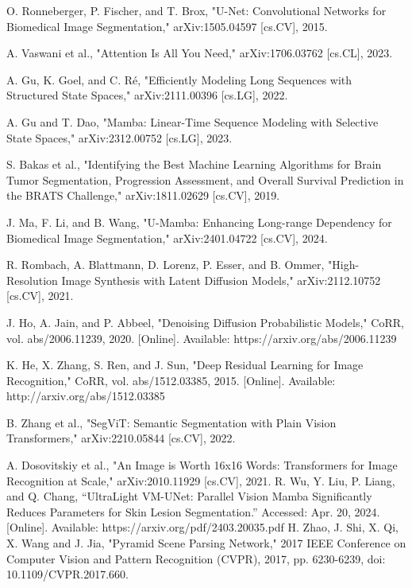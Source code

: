 \documentclass[conference]{IEEEtran}
\begin{document}
\begin{thebibliography}{00}
 O. Ronneberger, P. Fischer, and T. Brox, "U-Net: Convolutional Networks for Biomedical Image Segmentation," arXiv:1505.04597 [cs.CV], 2015.

 A. Vaswani et al., "Attention Is All You Need," arXiv:1706.03762 [cs.CL], 2023.

 A. Gu, K. Goel, and C. Ré, "Efficiently Modeling Long Sequences with Structured State Spaces," arXiv:2111.00396 [cs.LG], 2022.

 A. Gu and T. Dao, "Mamba: Linear-Time Sequence Modeling with Selective State Spaces," arXiv:2312.00752 [cs.LG], 2023.

 S. Bakas et al., "Identifying the Best Machine Learning Algorithms for Brain Tumor Segmentation, Progression Assessment, and Overall Survival Prediction in the BRATS Challenge," arXiv:1811.02629 [cs.CV], 2019.

 J. Ma, F. Li, and B. Wang, "U-Mamba: Enhancing Long-range Dependency for Biomedical Image Segmentation," arXiv:2401.04722 [cs.CV], 2024.

 R. Rombach, A. Blattmann, D. Lorenz, P. Esser, and B. Ommer, "High-Resolution Image Synthesis with Latent Diffusion Models," arXiv:2112.10752 [cs.CV], 2021.

 J. Ho, A. Jain, and P. Abbeel, "Denoising Diffusion Probabilistic Models," CoRR, vol. abs/2006.11239, 2020. [Online]. Available: https://arxiv.org/abs/2006.11239

 K. He, X. Zhang, S. Ren, and J. Sun, "Deep Residual Learning for Image Recognition," CoRR, vol. abs/1512.03385, 2015. [Online]. Available: http://arxiv.org/abs/1512.03385

 B. Zhang et al., "SegViT: Semantic Segmentation with Plain Vision Transformers," arXiv:2210.05844 [cs.CV], 2022.

 A. Dosovitskiy et al., "An Image is Worth 16x16 Words: Transformers for Image Recognition at Scale," arXiv:2010.11929 [cs.CV], 2021.
 R. Wu, Y. Liu, P. Liang, and Q. Chang, “UltraLight VM-UNet: Parallel Vision Mamba Significantly Reduces Parameters for Skin Lesion Segmentation.” Accessed: Apr. 20, 2024. [Online]. Available: https://arxiv.org/pdf/2403.20035.pdf
H. Zhao, J. Shi, X. Qi, X. Wang and J. Jia, "Pyramid Scene Parsing Network," 2017 IEEE Conference on Computer Vision and Pattern Recognition (CVPR), 2017, pp. 6230-6239, doi: 10.1109/CVPR.2017.660.
\end{thebibliography}
\end{document}

